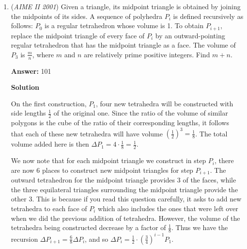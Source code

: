 \begin{enumerate}
 
 \[C_1: 3/3/0 \Longrightarrow \binom{6}{3} \cdot \left(\frac{1}{3}\right)^6 = \frac{20}{729}\]

 \[C_2: 2/2/2 \Longrightarrow \binom{6}{2}\binom{4}{2} \cdot \left(\frac{1}{3}\right)^6 = \frac{90}{729}\]

 \[C_3: 1/1/4 \Longrightarrow \binom{6}{4} \cdot 2 \cdot \left(\frac{1}{3}\right)^6 = \frac{30}{729}\]

 \[C_4: 0/0/6 \Longrightarrow \left(\frac{1}{3}\right)^6 = \frac{1}{729}\]

 Summing these up we get $\dfrac{141}{729} = \dfrac{47}{243}$. Now, we have $2x + \dfrac{47}{243} = 1$, where $x = P(\#\text{ of wins} > \text{losses})$. Solving, we get $x = \dfrac{98}{243} \Longrightarrow \boxed{341}$

 -jb2015007

 


	\item (\textit{AIME II 2001}) Given a triangle, its midpoint triangle is obtained by joining the midpoints of its sides. A sequence of polyhedra $P_{i}$ is defined recursively as follows: $P_{0}$ is a regular tetrahedron whose volume is 1. To obtain $P_{i + 1}$, replace the midpoint triangle of every face of $P_{i}$ by an outward-pointing regular tetrahedron that has the midpoint triangle as a face. The volume of $P_{3}$ is $\frac {m}{n}$, where $m$ and $n$ are relatively prime positive integers. Find $m + n$.


 
 \textbf{Answer: }101



\textbf{Solution}

On the first construction, $P_1$, four new tetrahedra will be constructed with side lengths $\frac 12$ of the original one. Since the ratio of the volume of similar polygons is the cube of the ratio of their corresponding lengths, it follows that each of these new tetrahedra will have volume $\left(\frac 12\right)^3 = \frac 18$. The total volume added here is then $\Delta P_1 = 4 \cdot \frac 18 = \frac 12$.

 We now note that for each midpoint triangle we construct in step $P_{i}$, there are now $6$ places to construct new midpoint triangles for step $P_{i+1}$. The outward tetrahedron for the midpoint triangle provides $3$ of the faces, while the three equilateral triangles surrounding the midpoint triangle provide the other $3$. This is because if you read this question carefully, it asks to add new tetrahedra to each face of $P_{i}$ which also includes the ones that were left over when we did the previous addition of tetrahedra. However, the volume of the tetrahedra being constructed decrease by a factor of $\frac 18$. Thus we have the recursion $\Delta P_{i+1} = \frac{6}{8} \Delta P_i$, and so $\Delta P_i = \frac 12 \cdot \left(\frac{3}{4}\right)^{i-1} P_1$.


\end{enumerate}

